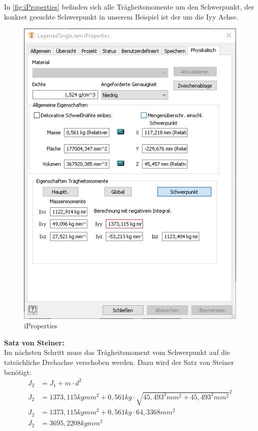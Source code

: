 In \autoref{fig:iProperties} befinden sich alle Trägheitsmomente um den Schwerpunkt, der konkret gesuchte Schwerpunkt in unserem Beispiel ist
der um die Iyy Achse.

\begin{figure}[H]
    \centering
    \includegraphics[scale=1,page=1]{fig/mech/iProberties.png}
    \caption{iProperties}
    \label{fig:iProperties}
\end{figure}

\textbf{Satz von Steiner:}\\
Im nächsten Schritt muss das Trägheitsmoment vom Schwerpunkt auf die tatsächliche Drehachse verschoben werden.
Dazu wird der Satz von Steiner benötigt:\\
\begin{align*}
    J_{2} &= J_{1}+m\cdot d^{2} \\
    J_{2} &= 1373,115 kgmm^{2}+0,561kg\cdot \sqrt{45,493^{2}mm^{2}+45,493^{2}mm^{2}}^{2} \\
    J_{2} &= 1373,115 kgmm^{2}+0,561kg\cdot 64,3368mm^{2} \\
    J_{2} &= 3695,2208 kgmm^{2} \\
\end{align*}

